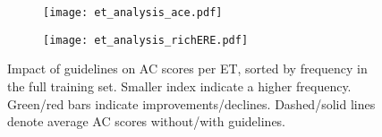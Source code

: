 \begin{figure}[t!]
    \centering
    \begin{subfigure}{0.49\linewidth}
        \centering
        \texttt{[image: et\_analysis\_ace.pdf]}
    \end{subfigure}
    \begin{subfigure}{0.49\linewidth}
        \centering
        \texttt{[image: et\_analysis\_richERE.pdf]}
    \end{subfigure}
    \caption{Impact of guidelines on AC scores per ET, sorted by frequency in the full training set. Smaller index indicate a higher frequency. Green/red bars indicate improvements/declines. Dashed/solid lines denote average AC scores without/with guidelines.
    }
    \label{fig:performance_by_type_frequency}
    \vspace{-12pt}
\end{figure}
